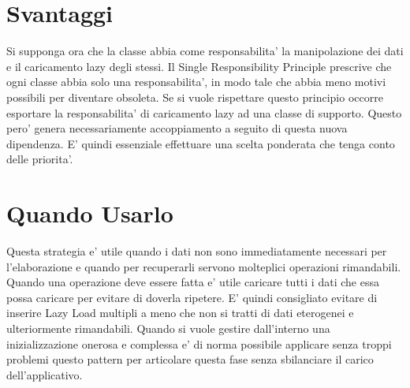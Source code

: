 \section{Svantaggi}

Si supponga ora che la classe abbia come responsabilita' la manipolazione dei dati e il caricamento lazy degli stessi.
Il Single Responsibility Principle prescrive che ogni classe abbia solo una responsabilita', in modo tale che abbia meno motivi possibili per diventare obsoleta.
Se si vuole rispettare questo principio occorre esportare la responsabilita' di caricamento lazy ad una classe di supporto.
Questo pero' genera necessariamente accoppiamento a seguito di questa nuova dipendenza.
E' quindi essenziale effettuare una scelta ponderata che tenga conto delle priorita'.

\section{Quando Usarlo}

Questa strategia e' utile quando i dati non sono immediatamente necessari per l'elaborazione e quando per recuperarli servono molteplici operazioni rimandabili.
Quando una operazione deve essere fatta e' utile caricare tutti i dati che essa possa caricare per evitare di doverla ripetere. E' quindi consigliato evitare di inserire Lazy Load multipli a meno che non si tratti di dati eterogenei e ulteriormente rimandabili.
Quando si vuole gestire dall'interno una inizializzazione onerosa e complessa e' di norma possibile applicare senza troppi problemi questo pattern per articolare questa fase senza sbilanciare il carico dell'applicativo.
